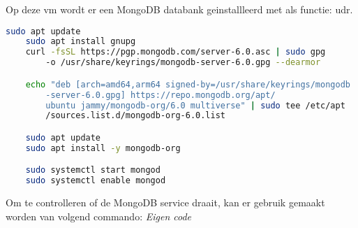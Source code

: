 Op deze \gls{vm} wordt er een MongoDB databank geinstallleerd met als functie: \gls{udr}.





\begin{lstlisting}[language=Bash, caption=Installatie van MongoDB]
    sudo apt update
    sudo apt install gnupg
    curl -fsSL https://pgp.mongodb.com/server-6.0.asc | sudo gpg 
        -o /usr/share/keyrings/mongodb-server-6.0.gpg --dearmor

    echo "deb [arch=amd64,arm64 signed-by=/usr/share/keyrings/mongodb
        -server-6.0.gpg] https://repo.mongodb.org/apt/
        ubuntu jammy/mongodb-org/6.0 multiverse" | sudo tee /etc/apt
        /sources.list.d/mongodb-org-6.0.list

    sudo apt update
    sudo apt install -y mongodb-org

    sudo systemctl start mongod 
    sudo systemctl enable mongod
\end{lstlisting}

Om te controlleren of de MongoDB service draait, kan er gebruik gemaakt worden van volgend commando: \textit{Eigen code}



